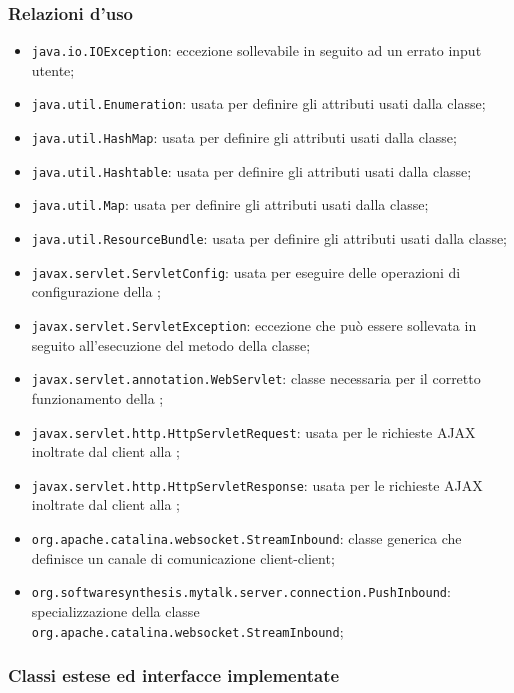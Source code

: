 \subsubsection*{Relazioni d'uso}
\begin{itemize}
	\item \texttt{java.io.IOException}: eccezione sollevabile in seguito ad un errato input utente;
	\item \texttt{java.util.Enumeration}: usata per definire gli attributi usati dalla classe;
	\item \texttt{java.util.HashMap}: usata per definire gli attributi usati dalla classe;
	\item \texttt{java.util.Hashtable}: usata per definire gli attributi usati dalla classe;
	\item \texttt{java.util.Map}: usata per definire gli attributi usati dalla classe;
	\item \texttt{java.util.ResourceBundle}: usata per definire gli attributi usati dalla classe;
	\item \texttt{javax.servlet.ServletConfig}: usata per eseguire delle operazioni di configurazione della ;
	\item \texttt{javax.servlet.ServletException}: eccezione che può essere sollevata in seguito all'esecuzione del metodo  della classe;
	\item \texttt{javax.servlet.annotation.WebServlet}: classe necessaria per il corretto funzionamento della ;
	\item \texttt{javax.servlet.http.HttpServletRequest}: usata per le richieste AJAX inoltrate dal client alla ;
	\item \texttt{javax.servlet.http.HttpServletResponse}: usata per le richieste AJAX inoltrate dal client alla ;
	\item \texttt{org.apache.catalina.websocket.StreamInbound}: classe generica che definisce un canale di comunicazione client-client;
	\item \texttt{org.softwaresynthesis.mytalk.server.connection.PushInbound}: specializzazione della classe \texttt{org.apache.catalina.websocket.StreamInbound};

\end{itemize}

\subsubsection*{Classi estese ed interfacce implementate}

